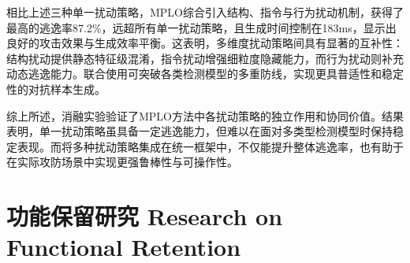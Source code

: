 

相比上述三种单一扰动策略，MPLO综合引入结构、指令与行为扰动机制，获得了最高的逃逸率87.2\%，远超所有单一扰动策略，且生成时间控制在183ms，显示出良好的攻击效果与生成效率平衡。这表明，多维度扰动策略间具有显著的互补性：结构扰动提供静态特征级混淆，指令扰动增强细粒度隐藏能力，而行为扰动则补充动态逃逸能力。联合使用可突破各类检测模型的多重防线，实现更具普适性和稳定性的对抗样本生成。


综上所述，消融实验验证了MPLO方法中各扰动策略的独立作用和协同价值。结果表明，单一扰动策略虽具备一定逃逸能力，但难以在面对多类型检测模型时保持稳定表现。而将多种扰动策略集成在统一框架中，不仅能提升整体逃逸率，也有助于在实际攻防场景中实现更强鲁棒性与可操作性。


\section{功能保留研究 Research on Functional Retention}


